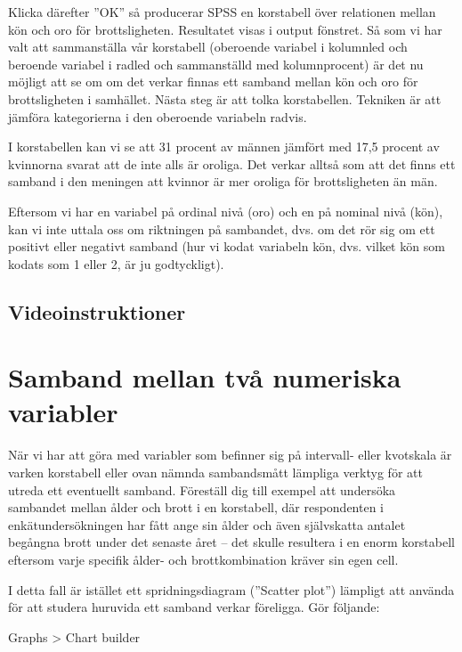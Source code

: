 \documentclass[
]{book}
\begin{document}
Klicka därefter ''OK'' så producerar SPSS en korstabell över relationen mellan kön och oro för brottsligheten.
Resultatet visas i output fönstret. Så som vi har valt att sammanställa vår korstabell (oberoende variabel
i kolumnled och beroende variabel i radled och sammanställd med kolumnprocent) är det nu möjligt att
se om om det verkar finnas ett samband mellan kön och oro för brottsligheten i samhället. Nästa steg är
att tolka korstabellen. Tekniken är att jämföra kategorierna i den oberoende variabeln radvis.

I korstabellen kan vi se att 31 procent av männen jämfört med 17,5 procent av kvinnorna svarat att de
inte alls är oroliga. Det verkar alltså som att det finns ett samband i den meningen att kvinnor är mer
oroliga för brottsligheten än män.

Eftersom vi har en variabel på ordinal nivå (oro) och en på nominal nivå (kön), kan vi inte uttala oss om
riktningen på sambandet, dvs. om det rör sig om ett positivt eller negativt samband (hur vi kodat
variabeln kön, dvs. vilket kön som kodats som 1 eller 2, är ju godtyckligt).

\hypertarget{videoinstruktioner-5}{%
\subsection{Videoinstruktioner}\label{videoinstruktioner-5}}

\hypertarget{samband-mellan-tvuxe5-numeriska-variabler}{%
\section{Samband mellan två numeriska variabler}\label{samband-mellan-tvuxe5-numeriska-variabler}}

När vi har att göra med variabler som befinner sig på intervall- eller kvotskala är varken korstabell eller
ovan nämnda sambandsmått lämpliga verktyg för att utreda ett eventuellt samband. Föreställ dig till
exempel att undersöka sambandet mellan ålder och brott i en korstabell, där respondenten i
enkätundersökningen har fått ange sin ålder och även självskatta antalet begångna brott under det
senaste året -- det skulle resultera i en enorm korstabell eftersom varje specifik ålder- och
brottkombination kräver sin egen cell.

I detta fall är istället ett spridningsdiagram (''Scatter plot'') lämpligt att använda för att studera huruvida
ett samband verkar föreligga. Gör följande:

Graphs \textgreater{} Chart builder
\end{document}
